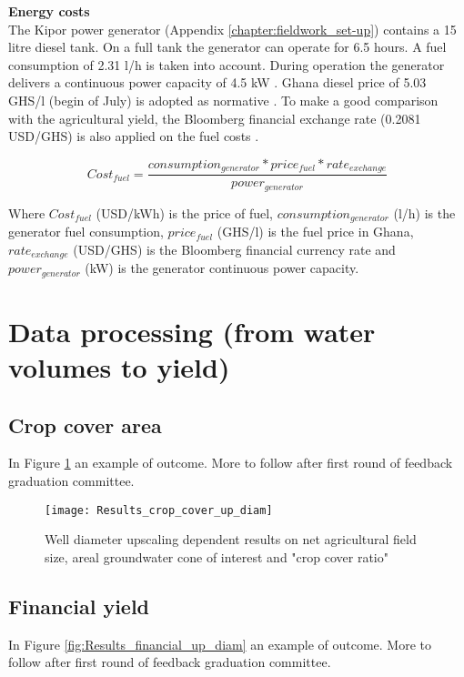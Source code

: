 \textbf{Energy costs} \\
The Kipor power generator (Appendix \ref{chapter:fieldwork_set-up}) contains a 15 litre diesel tank. On a full tank the generator can operate for 6.5 hours. A fuel consumption of 2.31 l/h is taken into account. During operation the generator delivers a continuous power capacity of 4.5 kW \citep{TS242018}. Ghana diesel price of 5.03 GHS/l (begin of July) is adopted as normative \citep{GlobalPetrolPrices2018}. To make a good comparison with the agricultural yield, the Bloomberg financial exchange rate (0.2081 USD/GHS) is also applied on the fuel costs \citep{Bloomberg2018}.

\begin{equation}
 Cost_{fuel} =  \frac{consumption_{generator} * price_{fuel} * rate_{exchange}}{power_{generator}}
\end{equation}

Where $Cost_{fuel}$ (USD/kWh) is the price of fuel,  $consumption_{generator}$ (l/h) is the generator fuel consumption,  $price_{fuel}$ (GHS/l) is the fuel price in Ghana, $rate_{exchange}$ (USD/GHS) is the Bloomberg financial currency rate and $power_{generator}$ (kW) is the generator continuous power capacity. 

\section{Data processing (from water volumes to yield)}
\label{section:Data_processing}

\subsection{Crop cover area}

In Figure \ref{fig:Results_crop_cover_up_diam} an example of outcome. More to follow after first round of feedback graduation committee.

\begin{figure}[h!]
 \centering
 \texttt{[image: Results\_crop\_cover\_up\_diam]}
 \captionsetup{justification=centering} 
 \caption{Well diameter upscaling dependent results on net agricultural field size, areal groundwater cone of interest and "crop cover ratio"}
 \label{fig:Results_crop_cover_up_diam}
\end{figure}

\subsection{Financial yield}
In Figure \ref{fig:Results_financial_up_diam} an example of outcome. More to follow after first round of feedback graduation committee. 


